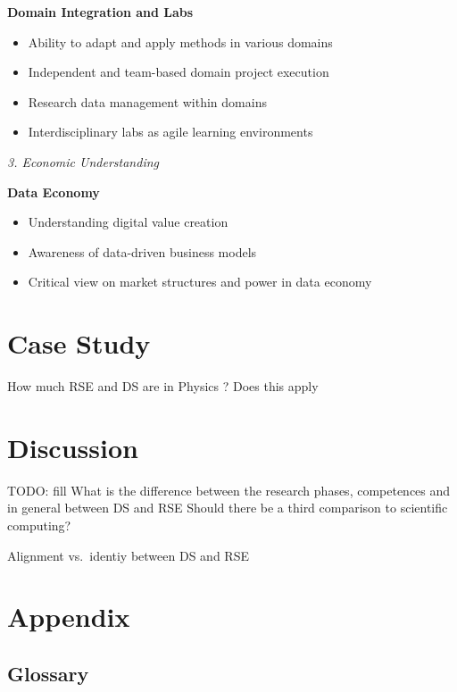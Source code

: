 \documentclass[
        english,biblatex
    ]{lni}
\providecommand{\tightlist}{%
    \setlength{\itemsep}{0pt}\setlength{\parskip}{0pt}}
\begin{document}
    \textbf{Domain Integration and Labs}

    \begin{itemize}
    \tightlist
    \item
      Ability to adapt and apply methods in various domains
    \item
      Independent and team-based domain project execution
    \item
      Research data management within domains
    \item
      Interdisciplinary labs as agile learning environments
    \end{itemize}

    \emph{3. Economic Understanding}

    \textbf{Data Economy}

    \begin{itemize}
    \tightlist
    \item
      Understanding digital value creation
    \item
      Awareness of data-driven business models
    \item
      Critical view on market structures and power in data economy
    \end{itemize}

    \section{Case Study}\label{case-study}

    How much RSE and DS are in Physics ? \textcite{florian} Does this
    apply

    \section{Discussion}\label{discussion}

    TODO: fill What is the difference between the research phases,
    competences and in general between DS and RSE Should there be a
    third comparison to scientific computing?

    Alignment vs.~identiy between DS and RSE

    \printbibliography

    \section{Appendix}\label{sec:appendix}

    \subsection{Glossary}\label{glossary}
\end{document}
